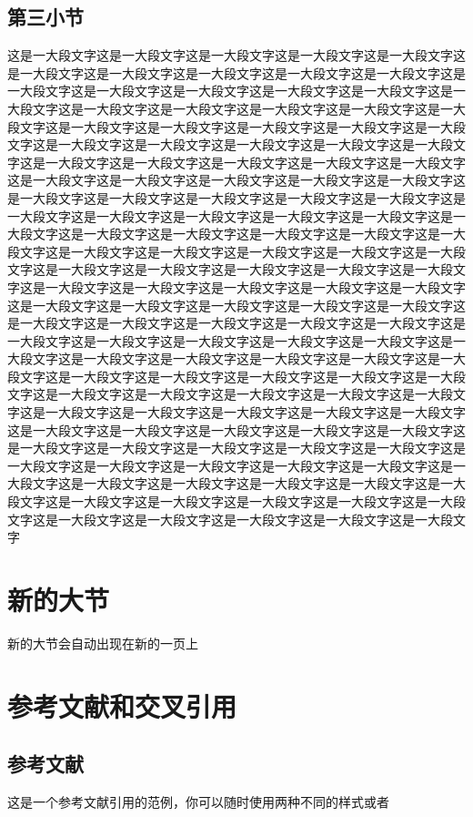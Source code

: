 \documentclass[supercite]{HustGraduTrans}
\begin{document}
    \subsection{第三小节}
    这是一大段文字这是一大段文字这是一大段文字这是一大段文字这是一大段文字这是一大段文字这是一大段文字这是一大段文字这是一大段文字这是一大段文字这是一大段文字这是一大段文字这是一大段文字这是一大段文字这是一大段文字这是一大段文字这是一大段文字这是一大段文字这是一大段文字这是一大段文字这是一大段文字这是一大段文字这是一大段文字这是一大段文字这是一大段文字这是一大段文字这是一大段文字这是一大段文字这是一大段文字这是一大段文字这是一大段文字这是一大段文字这是一大段文字这是一大段文字这是一大段文字这是一大段文字这是一大段文字这是一大段文字这是一大段文字这是一大段文字这是一大段文字这是一大段文字这是一大段文字这是一大段文字这是一大段文字这是一大段文字这是一大段文字这是一大段文字这是一大段文字这是一大段文字这是一大段文字这是一大段文字这是一大段文字这是一大段文字这是一大段文字这是一大段文字这是一大段文字这是一大段文字这是一大段文字这是一大段文字这是一大段文字这是一大段文字这是一大段文字这是一大段文字这是一大段文字这是一大段文字这是一大段文字这是一大段文字这是一大段文字这是一大段文字这是一大段文字这是一大段文字这是一大段文字这是一大段文字这是一大段文字这是一大段文字这是一大段文字这是一大段文字这是一大段文字这是一大段文字这是一大段文字这是一大段文字这是一大段文字这是一大段文字这是一大段文字这是一大段文字这是一大段文字这是一大段文字这是一大段文字这是一大段文字这是一大段文字这是一大段文字这是一大段文字这是一大段文字这是一大段文字这是一大段文字这是一大段文字这是一大段文字这是一大段文字这是一大段文字这是一大段文字这是一大段文字这是一大段文字这是一大段文字这是一大段文字这是一大段文字这是一大段文字这是一大段文字这是一大段文字这是一大段文字这是一大段文字这是一大段文字这是一大段文字这是一大段文字这是一大段文字这是一大段文字这是一大段文字这是一大段文字这是一大段文字这是一大段文字这是一大段文字这是一大段文字这是一大段文字这是一大段文字这是一大段文字这是一大段文字这是一大段文字这是一大段文字这是一大段文字这是一大段文字这是一大段文字这是一大段文字这是一大段文字这是一大段文字这是一大段文字这是一大段文字这是一大段文字这是一大段文字这是一大段文字
    \section{新的大节}
    新的大节会自动出现在新的一页上
    \section{参考文献和交叉引用}\label{sec:ref}
    \subsection{参考文献}
    这是一个参考文献引用的范例\cite{Stone_1998}，你可以随时使用两种不同的样式或者\supercite{Stone_1998}
    
\end{document}
